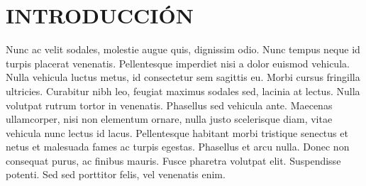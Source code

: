 \chapter{INTRODUCCIÓN}
\label{cap:Introduccion} %

Nunc ac velit sodales, molestie augue quis, dignissim odio. Nunc tempus neque id turpis placerat venenatis. Pellentesque imperdiet nisi a dolor euismod vehicula. Nulla vehicula luctus metus, id consectetur sem sagittis eu. Morbi cursus fringilla ultricies. Curabitur nibh leo, feugiat maximus sodales sed, lacinia at lectus. Nulla volutpat rutrum tortor in venenatis. Phasellus sed vehicula ante. Maecenas ullamcorper, nisi non elementum ornare, nulla justo scelerisque diam, vitae vehicula nunc lectus id lacus. Pellentesque habitant morbi tristique senectus et netus et malesuada fames ac turpis egestas. Phasellus et arcu nulla. Donec non consequat purus, ac finibus mauris. Fusce pharetra volutpat elit. Suspendisse potenti. Sed sed porttitor felis, vel venenatis enim.